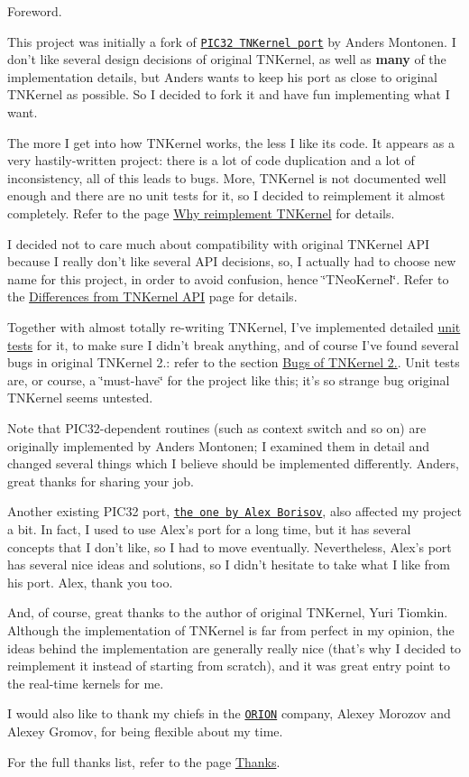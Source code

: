 Foreword.

This project was initially a fork of \href{https://github.com/andersm/TNKernel-PIC32}{\tt P\+I\+C32 T\+N\+Kernel port} by Anders Montonen. I don't like several design decisions of original T\+N\+Kernel, as well as {\bfseries many} of the implementation details, but Anders wants to keep his port as close to original T\+N\+Kernel as possible. So I decided to fork it and have fun implementing what I want.

The more I get into how T\+N\+Kernel works, the less I like its code. It appears as a very hastily-\/written project\+: there is a lot of code duplication and a lot of inconsistency, all of this leads to bugs. More, T\+N\+Kernel is not documented well enough and there are no unit tests for it, so I decided to reimplement it almost completely. Refer to the page \hyperlink{why_reimplement}{Why reimplement T\+N\+Kernel} for details.

I decided not to care much about compatibility with original T\+N\+Kernel A\+P\+I because I really don't like several A\+P\+I decisions, so, I actually had to choose new name for this project, in order to avoid confusion, hence \char`\"{}\+T\+Neo\+Kernel\char`\"{}. Refer to the \hyperlink{tnkernel_diff}{Differences from T\+N\+Kernel A\+P\+I} page for details.

Together with almost totally re-\/writing T\+N\+Kernel, I've implemented detailed \hyperlink{unit_tests}{unit tests} for it, to make sure I didn't break anything, and of course I've found several bugs in original T\+N\+Kernel 2.\+: refer to the section \hyperlink{why_reimplement_why_reimplement__bugs}{Bugs of T\+N\+Kernel 2.}. Unit tests are, or course, a \char`\"{}must-\/have\char`\"{} for the project like this; it's so strange bug original T\+N\+Kernel seems untested.

Note that P\+I\+C32-\/dependent routines (such as context switch and so on) are originally implemented by Anders Montonen; I examined them in detail and changed several things which I believe should be implemented differently. Anders, great thanks for sharing your job.

Another existing P\+I\+C32 port, \href{http://www.tnkernel.com/tn_port_pic24_dsPIC_PIC32.html}{\tt the one by Alex Borisov}, also affected my project a bit. In fact, I used to use Alex's port for a long time, but it has several concepts that I don't like, so I had to move eventually. Nevertheless, Alex's port has several nice ideas and solutions, so I didn't hesitate to take what I like from his port. Alex, thank you too.

And, of course, great thanks to the author of original T\+N\+Kernel, Yuri Tiomkin. Although the implementation of T\+N\+Kernel is far from perfect in my opinion, the ideas behind the implementation are generally really nice (that's why I decided to reimplement it instead of starting from scratch), and it was great entry point to the real-\/time kernels for me.

I would also like to thank my chiefs in the \href{http://orionspb.ru/}{\tt O\+R\+I\+O\+N} company, Alexey Morozov and Alexey Gromov, for being flexible about my time.

For the full thanks list, refer to the page \hyperlink{thanks}{Thanks}. 